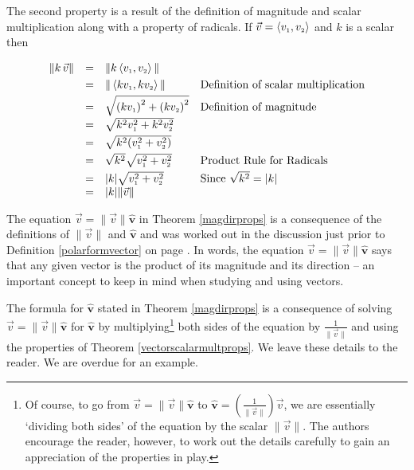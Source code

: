 \smallskip

The second property is a result of the definition of magnitude and scalar multiplication along with a property of radicals. If $\vec{v} = \left< v_{\mbox{\tiny $1$}} ,v_{\mbox{\tiny $2$}}\right>$ and $k$ is a scalar then 

\[ \begin{array}{rcll}

\| k \, \vec{v} \| & = & \| k \left< v_{\mbox{\tiny $1$}}, v_{\mbox{\tiny $2$}}\right> \| & \\ [3pt]
									 & = & \| \left<kv_{\mbox{\tiny $1$}},kv_{\mbox{\tiny $2$}}\right>\| & \text{Definition of scalar multiplication} \\ [3pt]
									 & = & \sqrt{\left(kv_{\mbox{\tiny $1$}}\right)^2 + \left(kv_{\mbox{\tiny $2$}}\right)^2} & \text{Definition of magnitude} \\ [3pt]
									 & = & \sqrt{k^2v_{\mbox{\tiny $1$}}^2 + k^2v_{\mbox{\tiny $2$}}^2} & \\[3pt]
									 & = & \sqrt{k^2(v_{\mbox{\tiny $1$}}^2+v_{\mbox{\tiny $2$}}^2)} & \\ [3pt]
									 & = & \sqrt{k^2} \sqrt{v_{\mbox{\tiny $1$}}^2+v_{\mbox{\tiny $2$}}^2} & \text{Product Rule for Radicals} \\ [3pt]
									 & = & |k| \sqrt{v_{\mbox{\tiny $1$}}^2+v_{\mbox{\tiny $2$}}^2} & \text{Since $\sqrt{k^2} = |k|$} \\
									 & = & |k| \| \vec{v} \| & \\
\end{array} \]

\smallskip

The equation $\vec{v} = \| \vec{v} \| \bm\hat{v}$ in Theorem \ref{magdirprops} is a consequence of the definitions of $\| \vec{v} \|$ and $\bm\hat{v}$ and was worked out in the discussion just prior to Definition \ref{polarformvector} on page \pageref{polarformvectorsection}.  In words, the equation $\vec{v} = \| \vec{v} \| \bm\hat{v}$  says that any given vector is the product of its magnitude and its direction -- an important concept to keep in mind when studying and using vectors. 

\smallskip

The formula for   $\bm\hat{v}$ stated  in Theorem \ref{magdirprops}  is a consequence of solving $\vec{v} = \| \vec{v} \| \bm\hat{v}$  for $\bm\hat{v}$ by multiplying\footnote{Of course, to go from $\vec{v} = \| \vec{v} \| \bm\hat{v}$ to $\bm\hat{v} = \left( \frac{1}{\|\vec{v}\|}\right) \vec{v}$, we are essentially `dividing both sides' of the equation by the scalar $\| \vec{v} \|$.  The authors encourage the reader, however, to work out the details carefully to gain an appreciation of the properties in play.} both sides of the equation by $\frac{1}{\| \vec{v} \|}$ and using the properties of Theorem \ref{vectorscalarmultprops}.  We leave these details to the reader. We are overdue for an example.

